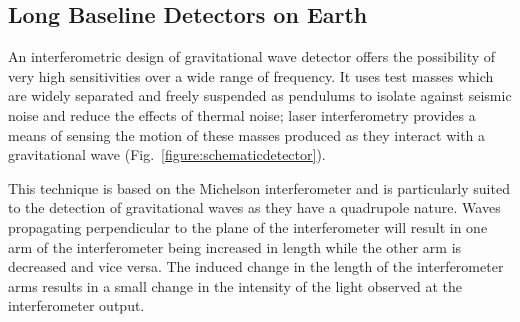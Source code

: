 \documentclass{article}
\begin{document}
\subsection{Long Baseline Detectors on Earth}
\label{subsection:earth}

An interferometric design of gravitational wave detector offers the possibility
of very high sensitivities over a wide range of frequency. It uses test masses
which are widely separated and freely suspended as pendulums to isolate against
seismic noise and reduce the effects of thermal noise; laser interferometry
provides a means of sensing the motion of these masses produced as they interact
with a gravitational wave (Fig.~\ref{figure:schematicdetector}).


This technique is based on the Michelson interferometer and is particularly
suited to the detection of gravitational waves as they have a quadrupole nature.
Waves propagating perpendicular to the plane of the interferometer will result
in one arm of the interferometer being increased in length while the other arm
is decreased and vice versa. The induced change in the length of the
interferometer arms results in a small change in the intensity of the light
observed at the interferometer output.
\end{document}
